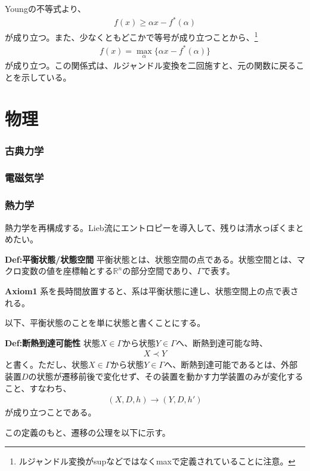 \documentclass[a4paper,11pt]{jsarticle}
\numberwithin{equation}{section}
\begin{document}
Youngの不等式より、
\begin{align}
  f(x)  \geq \alpha x - f^*(\alpha)
\end{align}
が成り立つ。また、少なくともどこかで等号が成り立つことから、\footnote{ルジャンドル変換がsupなどではなくmaxで定義されていることに注意。}
\begin{align}
  f(x) = \max_{\alpha} \{\alpha x - f^*(\alpha)\}
\end{align}
が成り立つ。この関係式は、ルジャンドル変換を二回施すと、元の関数に戻ることを示している。\\

\part{物理}
\section{古典力学}

\section{電磁気学}

\section{熱力学}
熱力学を再構成する。Lieb流にエントロピーを導入して、残りは清水っぽくまとめたい。\\

\begin{itembox}[l]{\textbf{Def:平衡状態/状態空間}}
  平衡状態とは、状態空間の点である。状態空間とは、マクロ変数の値を座標軸とする$\mathbb{R}^n$の部分空間であり、$\Gamma$で表す。
\end{itembox}

\begin{itembox}[l]{\textbf{Axiom1}}
  系を長時間放置すると、系は平衡状態に達し、状態空間上の点で表される。
\end{itembox}

以下、平衡状態のことを単に状態と書くことにする。\\

\begin{itembox}[l]{\textbf{Def:断熱到達可能性}}
  状態$X \in \Gamma$から状態$Y \in \Gamma$へ、断熱到達可能な時、
  \begin{align}
    X \prec Y
  \end{align}
  と書く。ただし、状態$X \in \Gamma$から状態$Y \in \Gamma$へ、断熱到達可能であるとは、外部装置$D$の状態が遷移前後で変化せず、その装置を動かす力学装置のみが変化すること、すなわち、
  \begin{align}
    (X , D , h) \rightarrow (Y , D , h')
  \end{align}
  が成り立つことである。

\end{itembox}
この定義のもと、遷移の公理を以下に示す。\\
\end{document}

